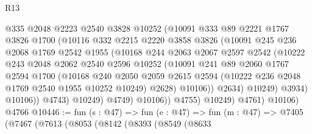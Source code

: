 \begin{lexlean}{R13}
\begin{coremodule}
                        @335
                        @2048
                        @2223
                        @2540
                        @3828
                        @10252
                        (@10091
                          @333
                          @89
                          @2221
                          @1767
                          @3826
                          @1700
                          (@10116
                            @332
                            @2215
                            @2220
                            @3858
                            @3826
                            (@10091
                              @245
                              @236
                              @2068
                              @1769
                              @2542
                              @1955
                              (@10168
                                @244
                                @2063
                                @2067
                                @2597
                                @2542
                                (@10222
                                  @243
                                  @2048
                                  @2062
                                  @2540
                                  @2596
                                  @10252
                                  (@10091
                                    @241
                                    @89
                                    @2060
                                    @1767
                                    @2594
                                    @1700
                                    (@10168
                                      @240
                                      @2050
                                      @2059
                                      @2615
                                      @2594
                                      (@10222 @236 @2048 @1769 @2540 @1955 @10252 @10249)
                                      @2628)
                                    @10106))
                                @2634)
                              @10249)
                            @3934)
                          @10106))
                      @4743)
                    @10249)
                  @4749)
                @10106))
            @4755)
          @10249)
        @4761)
      @10106)
    @4766
@10446 := fun (s : @47) =>
  fun (e : @47) =>
  fun (m : @47) =>
  @7405
    (@7467
      (@7613
        (@8053
          (@8142
            (@8393
              (@8549
                (@8633

\end{coremodule}
\end{lexlean}
